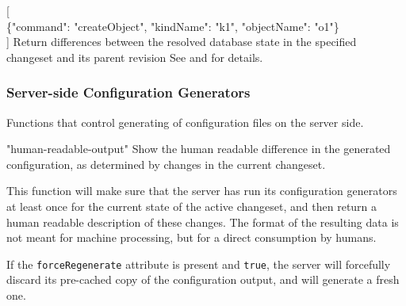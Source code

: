 \documentclass{article}
\begin{document}
    {[ \\
    \{"command": "createObject", "kindName": "k1", "objectName": "o1"\} \\
    ]}
    {Return differences between the resolved database state in the specified changeset and its parent revision}
    {See  and  for details.}

\subsubsection{Server-side Configuration Generators}
\label{sec:api-group-conf-generators}

Functions that control generating of configuration files on the server side.

    {"human-readable-output"}
    {Show the human readable difference in the generated configuration, as determined by changes in the current
    changeset.}
    {This function will make sure that the server has run its configuration generators at least once for the current
    state of the active changeset, and then return a human readable description of these changes.  The format of the
    resulting data is not meant for machine processing, but for a direct consumption by humans.

    If the {\tt forceRegenerate} attribute is present and {\tt true}, the server will forcefully discard its pre-cached
    copy of the configuration output, and will generate a fresh one.}
\end{document}
